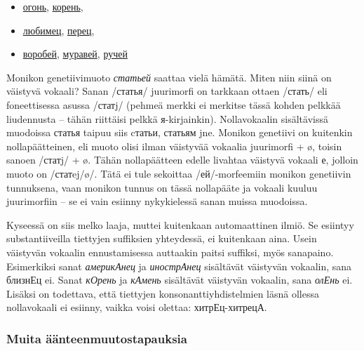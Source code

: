 \documentclass[]{scrreprt}
\begin{document}
\begin{itemize}
\item
  \href{https://ru.wiktionary.org/wiki/\%D0\%BE\%D0\%B3\%D0\%BE\%D0\%BD\%D1\%8C}{огонь},
  \href{https://ru.wiktionary.org/wiki/\%D0\%BA\%D0\%BE\%D1\%80\%D0\%B5\%D0\%BD\%D1\%8C}{корень},
\item
  \href{https://ru.wiktionary.org/wiki/\%D0\%BB\%D1\%8E\%D0\%B1\%D0\%B8\%D0\%BC\%D0\%B5\%D1\%86}{любимец},
  \href{https://ru.wiktionary.org/wiki/\%D0\%BF\%D0\%B5\%D1\%80\%D0\%B5\%D1\%86}{перец},
\item
  \href{https://ru.wiktionary.org/wiki/\%D0\%B2\%D0\%BE\%D1\%80\%D0\%BE\%D0\%B1\%D0\%B5\%D0\%B9}{воробей},
  \href{https://ru.wiktionary.org/wiki/\%D0\%BC\%D1\%83\%D1\%80\%D0\%B0\%D0\%B2\%D0\%B5\%D0\%B9}{муравей},
  \href{https://ru.wiktionary.org/wiki/\%D1\%80\%D1\%83\%D1\%87\%D0\%B5\%D0\%B9}{ручей}
\end{itemize}

Monikon genetiivimuoto \emph{статьей} saattaa vielä hämätä. Miten niin
siinä on väistyvä vokaali? Sanan /статья/ juurimorfi on tarkkaan ottaen
/стать/ eli foneettisessa asussa /статj/ (pehmeä merkki ei merkitse
tässä kohden pelkkää liudennusta -- tähän riittäisi pelkkä
я-kirjainkin). Nollavokaalin sisältävissä muodoissa статья taipuu siis
cтатьи, статьям jne. Monikon genetiivi on kuitenkin nollapäätteinen, eli
muoto olisi ilman väistyvää vokaalia juurimorfi + ø, toisin sanoen
/статj/ + ø. Tähän nollapäätteen edelle livahtaa väistyvä vokaali е,
jolloin muoto on /статej/ø/. Tätä ei tule sekoittaa /ей/-morfeemiin
monikon genetiivin tunnuksena, vaan monikon tunnus on tässä nollapääte
ja vokaali kuuluu juurimorfiin -- se ei vain esiinny nykykielessä sanan
muissa muodoissa.

Kyseessä on siis melko laaja, muttei kuitenkaan automaattinen ilmiö. Se
esiintyy substantiiveilla tiettyjen suffiksien yhteydessä, ei kuitenkaan
aina. Usein väistyvän vokaalin ennustamisessa auttaakin paitsi suffiksi,
myös sanapaino. Esimerkiksi sanat \emph{америкАнец} ja \emph{инострАнец}
sisältävät väistyvän vokaalin, sana близнЕц ei. Sanat \emph{кОрень} ja
\emph{кАмень} sisältävät väistyvän vokaalin, sana \emph{олЕнь} ei.
Lisäksi on todettava, että tiettyjen konsonanttiyhdistelmien läsnä
ollessa nollavokaali ei esiinny, vaikka voisi olettaa: хитрЕц-хитрецА.

\subsubsection{Muita
äänteenmuutostapauksia}\label{muita-uxe4uxe4nteenmuutostapauksia}
\end{document}
